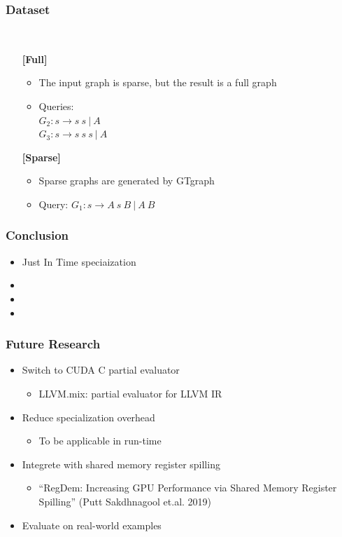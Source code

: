 \documentclass[xcolor=table]{beamer}
\begin{document}
\begin{frame}[fragile] \frametitle{Dataset}
  \begin{minipage}[t]{1cm}
\hspace{1cm}
  \end{minipage}
  ~
\begin{minipage}[t]{0.85\textwidth}
\begin{itemize}
\item[\textbf{[Full]}]
\begin{itemize}
  \item The input graph is sparse, but the result is a full graph
  \item Queries: \\ $G_2: s \to s \ s \ | \ A$ \\ $G_3: s \to s \ s \ s \ | \ A$
\end{itemize}
\pause
\item[\textbf{[Sparse]}]
\begin{itemize}
  \item Sparse graphs are generated by GTgraph
  \item Query: $G_1: s \to A \ s \ B \ | \ A \ B$
\end{itemize}
\end{itemize}
\end{minipage}
\end{frame}

\begin{frame} \frametitle{Conclusion}
  \begin{itemize}
   \item Just In Time speciaization
   \item
   \item
   \item
  \end{itemize}
\end{frame}

\begin{frame}[fragile] \frametitle{Future Research}
  \begin{itemize}
    \item Switch to CUDA C partial evaluator
    \begin{itemize}
      \item LLVM.mix: partial evaluator for LLVM IR
    \end{itemize}
    \pause
    \item Reduce specialization overhead
    \begin{itemize}
      \item To be applicable in run-time
    \end{itemize}
    \pause
    \item Integrete with shared memory register spilling
    \begin{itemize}
      \item ``RegDem: Increasing GPU Performance via Shared Memory Register Spilling'' (Putt Sakdhnagool et.al. 2019)
    \end{itemize}
    \pause
    \item Evaluate on real-world examples
  \end{itemize}
\end{frame}
\end{document}
